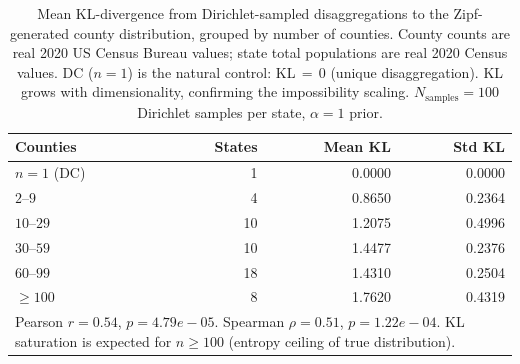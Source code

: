 \begin{table}[ht]
\centering
\caption{%
  Mean KL-divergence from Dirichlet-sampled disaggregations to the
  Zipf-generated county distribution, grouped by number of counties.
  County counts are real 2020 US Census Bureau values; state total
  populations are real 2020 Census values.
  DC ($n=1$) is the natural control: KL$\,{=}\,0$ (unique disaggregation).
  KL grows with dimensionality, confirming the impossibility scaling.
  $N_{\text{samples}}=100$ Dirichlet samples per state, $\alpha=1$ prior.
}
\label{tab:census_disaggregation}
\begin{tabular}{lrrr}
\toprule
Counties & States & Mean KL & Std KL \\
\midrule
$n=1$ (DC) & 1 & 0.0000 & 0.0000 \\
$2$–$9$ & 4 & 0.8650 & 0.2364 \\
$10$–$29$ & 10 & 1.2075 & 0.4996 \\
$30$–$59$ & 10 & 1.4477 & 0.2376 \\
$60$–$99$ & 18 & 1.4310 & 0.2504 \\
$\geq 100$ & 8 & 1.7620 & 0.4319 \\
\bottomrule
\multicolumn{4}{l}{%
  \footnotesize
  Pearson $r = 0.54$, $p = 4.79e-05$. Spearman $\rho = 0.51$, $p = 1.22e-04$.
  KL saturation is expected for $n \geq 100$ (entropy ceiling of true distribution).
} \\
\end{tabular}
\end{table}

